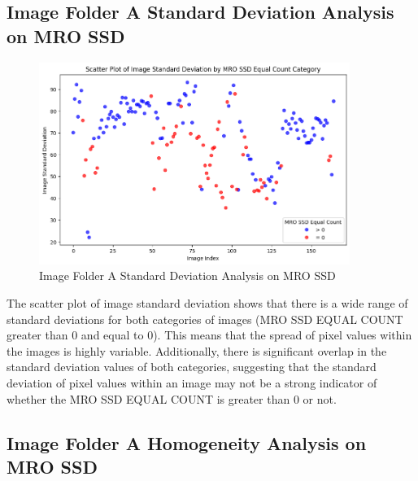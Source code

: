 \newpage

\subsection{Image Folder A Standard Deviation Analysis on MRO SSD}


\begin{figure}[ht]
    \centering
    \includegraphics[width=0.9\textwidth]{Figures/Results/sipa_02/sd.png}
    \caption[Image Folder A Standard Deviation Analysis on MRO SSD]{Image Folder A Standard Deviation Analysis on MRO SSD}
    \label{fig:Image Folder A Standard Deviation Analysis on MRO SSD}
\end{figure}

The scatter plot of image standard deviation shows that there is a wide range of standard deviations for both categories of images (MRO SSD EQUAL COUNT greater than 0 and equal to 0). This means that the spread of pixel values within the images is highly variable. Additionally, there is significant overlap in the standard deviation values of both categories, suggesting that the standard deviation of pixel values within an image may not be a strong indicator of whether the MRO SSD EQUAL COUNT is greater than 0 or not.


\newpage

\subsection{Image Folder A Homogeneity Analysis on MRO SSD}


